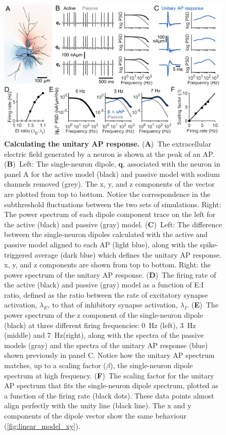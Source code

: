 \begin{figure}[t!]
	\centering
	\includegraphics[width=13.2cm]{Figures/chapter3/figure1.png}
    
    \caption{\textbf{Calculating the unitary AP response.} (\textbf{A})~The extracellular electric field generated by a neuron is shown at the peak of an AP. (\textbf{B})~Left: The single-neuron dipole, $\bm{q}$, associated with the neuron in panel A for the active model (black) and passive model with sodium channels removed (grey). The x, y, and z components of the vector are plotted from top to bottom. Notice the correspondence in the subthreshold fluctuations between the two sets of simulations. Right: The power spectrum of each dipole component trace on the left for the active (black) and passive (gray) model. (\textbf{C})~Left: The difference between the single-neuron dipoles calculated with the active and passive model aligned to each AP (light blue), along with the spike-triggered average (dark blue) which defines the unitary AP response. x, y, and z components are shown from top to bottom. Right: the power spectrum of the unitary AP response. (\textbf{D})~The firing rate of the active (black) and passive (gray) model as a function of E:I ratio, defined as the ratio between the rate of excitatory synapse activation, $\lambda_E$, to that of inhibitory synapse activation, $\lambda_I$. (\textbf{E})~The power spectrum of the z component of the single-neuron dipole (black) at three different firing frequencies: 0~\unit{\hertz} (left), 3~\unit{\hertz} (middle) and 7~\unit{\hertz}(right), along with the spectra of the passive models (gray) and the spectra of the unitary AP response (blue) shown previously in panel C. Notice how the unitary AP spectrum matches, up to a scaling factor ($\beta$), the single-neuron dipole spectrum at high frequency. (\textbf{F})~The scaling factor for the unitary AP spectrum that fits the single-neuron dipole spectrum, plotted as a function of the firing rate (black dots). These data points almost align perfectly with the unity line (black line). The x and y components of the dipole vector show the same behaviour ({\autoref{fig:linear_model_xy}}).} 
    \label{fig:example_uAP}
\end{figure}

